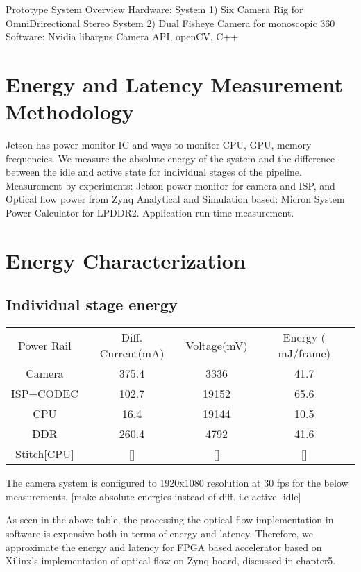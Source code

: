 Prototype System Overview\newline
Hardware:
System 1) Six Camera Rig for OmniDrirectional Stereo\newline
System 2) Dual Fisheye Camera for monoscopic 360 \newline
Software:
Nvidia libargus Camera API,
openCV, C++ \newline

\section{Energy and Latency Measurement Methodology}
Jetson has power monitor IC and ways to moniter CPU, GPU, memory frequencies. We measure the absolute energy of the system and the difference between the idle and active state for individual stages of the pipeline.
Measurement by experiments:
Jetson power monitor for camera and ISP, and Optical flow power from Zynq\newline
Analytical and Simulation based:
Micron System Power Calculator for LPDDR2. \newline
Application run time measurement.




\section{Energy Characterization}
\subsection{Individual stage energy}
	\begin{tabular}{c|c|c|c}
	Power Rail & Diff. Current(mA) & Voltage(mV) & Energy ( mJ/frame) \\
	Camera & 375.4 & 3336 & 41.7 \\
	ISP+CODEC & 102.7 & 19152 & 65.6 \\
	CPU & 16.4 & 19144 & 10.5 \\
	DDR & 260.4 & 4792 & 41.6 \\
	Stitch[CPU] & [] & [] & [] \\
	\end{tabular} \newline \newline
	The camera system is configured to 1920x1080 resolution at 30 fps for the below measurements. [make absolute energies instead of diff. i.e active -idle]\newline
	
	As seen in the above table, the processing  the optical flow implementation in software is expensive both in terms of energy and latency. Therefore, we approximate the energy and latency for FPGA based accelerator based on Xilinx's implementation of optical flow on Zynq board, discussed in chapter5.\newline

